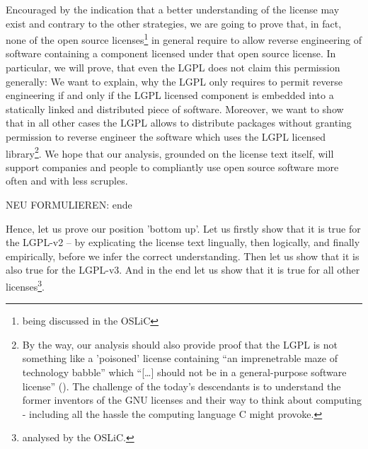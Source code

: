 Encouraged by the indication that a better understanding of the license may
exist and contrary to the other strategies, we are going to prove that, in
fact, none of the open source licenses\footnote{being discussed in the OSLiC} in
general require to allow reverse engineering of software containing a component
licensed under that open source license. In particular, we will prove, that even
the LGPL does not claim this permission generally: We want to explain, why the
LGPL only requires to permit reverse engineering if and only if the LGPL
licensed component is embedded into a statically linked and distributed piece of
software. Moreover, we want to show that in all other cases the LGPL allows 
to distribute packages without granting permission to reverse engineer the
software which uses the LGPL licensed library\footnote{By the way, our analysis
should also provide proof that the LGPL is not something like a 'poisoned'
license containing \enquote{an imprenetrable maze of technology babble} which
\enquote{[\ldots] should not be in a general-purpose software license}
(\cite[cf.][124]{Rosen2005a}). The challenge of the today's descendants is to
understand the former inventors of the GNU licenses and their way to think about
computing - including all the hassle the computing language C might provoke.}.
We hope that our analysis, grounded on the license text itself, will support
companies and people to compliantly use open source software more often and with
less scruples.

NEU FORMULIEREN: ende

Hence, let us prove our position 'bottom up'. Let us firstly show that it is
true for the LGPL-v2 -- by explicating the license text lingually, then
logically, and finally empirically, before we infer the correct understanding.
Then let us show that it is also true for the LGPL-v3. And in the end let us
show that it is true for all other licenses\footnote{analysed by the OSLiC.}.

